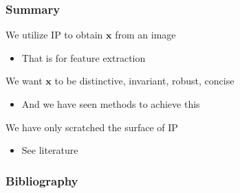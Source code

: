 \documentclass[xetex,professionalfont]{beamer}
\renewcommand{\vec}[1]{\ensuremath{\mathbf{#1}}}
\newcommand{\vx}{\vec{x}}
\begin{document}
\begin{frame}
\frametitle{Summary}

We utilize IP to obtain $\vx$ from an image
\begin{itemize}
	\item That is for feature extraction
\end{itemize}

\bigskip
We want $\vx$ to be distinctive, invariant, robust, concise
\begin{itemize}
	\item And we have seen methods to achieve this
\end{itemize}

\bigskip
We have only scratched the surface of IP
\begin{itemize}
	\item See literature
\end{itemize}

\end{frame}


\begin{frame}
\frametitle{Bibliography}

\printbibliography

\end{frame}
\end{document}
